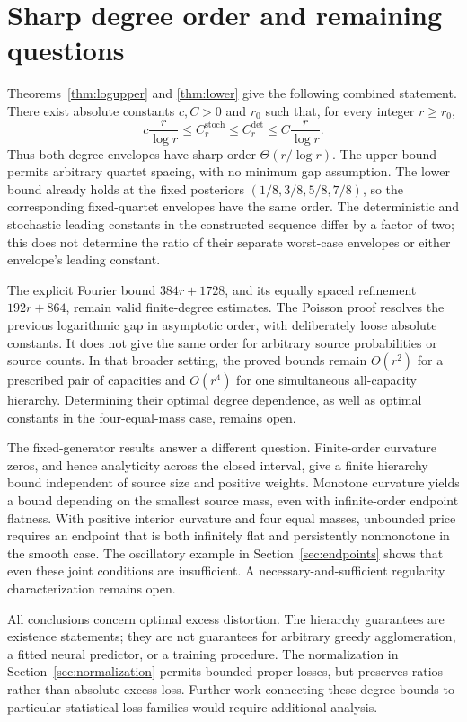 \documentclass[11pt]{article}
\theoremstyle{definition}\newtheorem{definition}[theorem]{Definition}
\theoremstyle{remark}\newtheorem{remark}[theorem]{Remark}
\newcommand{\detp}{\mathrm{det}}
\newcommand{\stp}{\mathrm{stoch}}
\begin{document}
\section{Sharp degree order and remaining questions}
\label{sec:conclusion}
Theorems~\ref{thm:logupper} and \ref{thm:lower} give the following combined statement. There exist absolute constants $c,C>0$ and $r_0$ such that, for every integer $r\ge r_0$,
\begin{equation}
c\frac{r}{\log r}\le C_r^{\stp}\le C_r^{\detp}
\le C\frac{r}{\log r}.
\label{eq:mainbounds}
\end{equation}
Thus both degree envelopes have sharp order $\Theta(r/\log r)$. The upper bound permits arbitrary quartet spacing, with no minimum gap assumption. The lower bound already holds at the fixed posteriors $(1/8,3/8,5/8,7/8)$, so the corresponding fixed-quartet envelopes have the same order. The deterministic and stochastic leading constants in the constructed sequence differ by a factor of two; this does not determine the ratio of their separate worst-case envelopes or either envelope's leading constant.

The explicit Fourier bound $384r+1728$, and its equally spaced refinement $192r+864$, remain valid finite-degree estimates. The Poisson proof resolves the previous logarithmic gap in asymptotic order, with deliberately loose absolute constants. It does not give the same order for arbitrary source probabilities or source counts. In that broader setting, the proved bounds remain $O(r^2)$ for a prescribed pair of capacities and $O(r^4)$ for one simultaneous all-capacity hierarchy. Determining their optimal degree dependence, as well as optimal constants in the four-equal-mass case, remains open.

The fixed-generator results answer a different question. Finite-order curvature zeros, and hence analyticity across the closed interval, give a finite hierarchy bound independent of source size and positive weights. Monotone curvature yields a bound depending on the smallest source mass, even with infinite-order endpoint flatness. With positive interior curvature and four equal masses, unbounded price requires an endpoint that is both infinitely flat and persistently nonmonotone in the smooth case. The oscillatory example in Section~\ref{sec:endpoints} shows that even these joint conditions are insufficient. A necessary-and-sufficient regularity characterization remains open.

All conclusions concern optimal excess distortion. The hierarchy guarantees are existence statements; they are not guarantees for arbitrary greedy agglomeration, a fitted neural predictor, or a training procedure. The normalization in Section~\ref{sec:normalization} permits bounded proper losses, but preserves ratios rather than absolute excess loss. Further work connecting these degree bounds to particular statistical loss families would require additional analysis.
\end{document}
